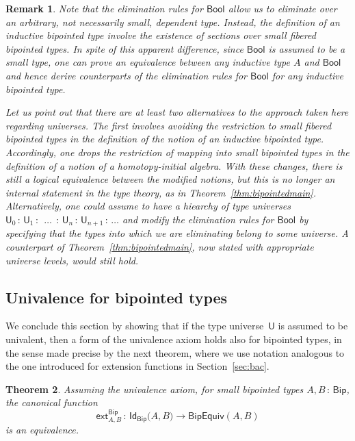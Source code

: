 \documentclass[10pt,a4paper,oneside,reqno]{amsart}
\numberwithin{equation}{section}
\theoremstyle{mythm}
\newtheorem{theorem}{Theorem}[section]
\theoremstyle{mydef}
\theoremstyle{myrmk}
\newtheorem{remark}[theorem]{Remark}
\newcommand{\ie}{\text{i.e.\ }}
\newcommand{\co}{\,{:}\,}
\newcommand{\ext}{\mathsf{ext}}
\newcommand{\Bool}{\mathsf{Bool}}
\newcommand{\Id}{\mathsf{Id}}
\newcommand{\U}{\mathsf{U}}
\newcommand{\Bip}{\mathsf{Bip}}
\newcommand{\BipEquiv}{\mathsf{BipEquiv}}
\begin{document}
\begin{remark} \label{thm:smallelimination} Note that the elimination rules for $\Bool$ allow us to eliminate 
over an arbitrary, \ie not necessarily small, dependent type. Instead, the definition of an inductive bipointed
type involve the existence of sections over small fibered bipointed types. In spite of this apparent difference,
since $\Bool$ is assumed to be a small type, one can prove an equivalence between any inductive type $A$
and $\Bool$ and hence derive counterparts of the elimination rules for $\Bool$ for any inductive bipointed type. 

Let us point out that there are at least two alternatives to the approach taken here regarding universes. The first involves avoiding the restriction
to \emph{small} fibered bipointed types in the definition of the notion of an inductive bipointed type. Accordingly,
one drops the restriction of mapping into \emph{small} bipointed types in the definition of a notion of a homotopy-initial
algebra. With these changes, there is still a logical equivalence between the modified notions, but this is no longer an internal statement in the type theory, as in Theorem~\ref{thm:bipointedmain}. Alternatively, one could assume to
have a hiearchy of type universes $\U_0 \co \U_1 \co \; \ldots \; \co \U_n \co \U_{n+1} \co \ldots$ and modify the elimination rules for $\Bool$ by specifying that the types into which we are eliminating belong to some universe. 
A counterpart of Theorem~\ref{thm:bipointedmain}, now stated with appropriate universe levels, would still hold.
 \end{remark}


\subsection*{Univalence for bipointed types} \label{sec:unibip}
We conclude this section by showing that if the type universe~$\U$ is assumed to be univalent, then a form of the univalence axiom holds also for bipointed types, in the sense made precise by the next theorem, where we
use notation analogous to the one introduced for extension functions in Section~\ref{sec:bac}. 


\begin{theorem}  \label{thm:bipunivalence} Assuming the univalence axiom, 
for small bipointed types $A, B \co \Bip$, the  canonical function
\[ 
\ext^{\Bip}_{A,B} \co \Id_{\Bip} \big(A,B\big) \to  \BipEquiv(A,B) 
\] 
is an equivalence.
\end{theorem} 
\end{document}
